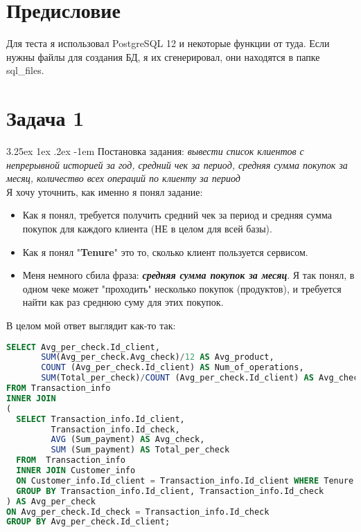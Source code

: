 \documentclass[12pt, a3paper]{article}
\makeatletter
\renewcommand\paragraph{\@startsection{paragraph}{5}{\z@}%
  {3.25ex \@plus1ex \@minus.2ex}%
  {-1em}%
  {\normalfont\normalsize\bfseries}}
\makeatother
\begin{document}

\tableofcontents

\newpage

\section{Предисловие}

Для теста я использовал PostgreSQL 12 и некоторые функции от туда.
Если нужны файлы для создания БД, я их сгенерировал, они находятся в папке sql\_files.

\section{Задача 1}

\paragraph{Постановка задания:} \emph{вывести список клиентов с непрерывной историей за год, 
средний чек за период, средняя сумма покупок за месяц, количество всех операций по клиенту за период}
\\[0.1cm]
\noindent
Я хочу уточнить, как именно я понял задание: 
\begin{itemize}
    \item Как я понял, требуется получить средний чек за период и средняя 
    сумма покупок для каждого клиента (НЕ в целом для всей базы). 
    \item Как я понял "\textbf{Tenure}" это то, сколько клиент пользуется сервисом.
    \item Меня немного сбила фраза: \emph{\textbf{средняя сумма покупок за месяц}}. 
    Я так понял, в одном чеке может "проходить" несколько покупок (продуктов), и требуется
    найти как раз среднюю суму для этих покупок.
\end{itemize}
\noindent
В целом мой ответ выглядит как-то так:
\begin{lstlisting}[language=SQL]
SELECT Avg_per_check.Id_client, 
       SUM(Avg_per_check.Avg_check)/12 AS Avg_product, 
       COUNT (Avg_per_check.Id_client) AS Num_of_operations, 
       SUM(Total_per_check)/COUNT (Avg_per_check.Id_client) AS Avg_check
FROM Transaction_info
INNER JOIN
(
  SELECT Transaction_info.Id_client, 
         Transaction_info.Id_check, 
         AVG (Sum_payment) AS Avg_check, 
         SUM (Sum_payment) AS Total_per_check 
  FROM  Transaction_info 
  INNER JOIN Customer_info
  ON Customer_info.Id_client = Transaction_info.Id_client WHERE Tenure = 12
  GROUP BY Transaction_info.Id_client, Transaction_info.Id_check
) AS Avg_per_check
ON Avg_per_check.Id_check = Transaction_info.Id_check
GROUP BY Avg_per_check.Id_client;
\end{lstlisting}
\end{document}
